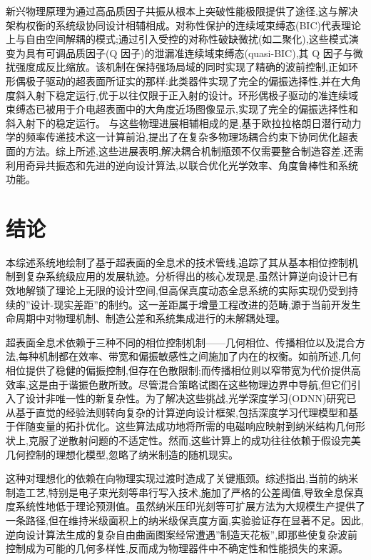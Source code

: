 \documentclass[11pt]{article}
\begin{document}
新兴物理原理为通过高品质因子共振从根本上突破性能极限提供了途径,这与解决架构权衡的系统级协同设计相辅相成。对称性保护的连续域束缚态(BIC)代表理论上与自由空间解耦的模式;通过引入受控的对称性破缺微扰(如二聚化),这些模式演变为具有可调品质因子(Q 因子)的泄漏准连续域束缚态(quasi-BIC),其 Q 因子与微扰强度成反比缩放。该机制在保持强场局域的同时实现了精确的波前控制,正如环形偶极子驱动的超表面所证实的那样:此类器件实现了完全的偏振选择性,并在大角度斜入射下稳定运行,优于以往仅限于正入射的设计。环形偶极子驱动的准连续域束缚态已被用于介电超表面中的大角度近场图像显示,实现了完全的偏振选择性和斜入射下的稳定运行。\citep{s2_5a46bf1115a13c8e88d03d52a56e80871e3550cd_094f009d} 与这些物理进展相辅相成的是,基于欧拉拉格朗日潜行动力学的频率传递技术这一计算前沿,提出了在复杂多物理场耦合约束下协同优化超表面的方法。综上所述,这些进展表明,解决耦合机制瓶颈不仅需要整合制造容差,还需利用奇异共振态和先进的逆向设计算法,以联合优化光学效率、角度鲁棒性和系统功能。\citep{doi_10_1103_physrevapplied_21_044004_d1b93ffe} \citep{s2_5a46bf1115a13c8e88d03d52a56e80871e3550cd_094f009d} \citep{doi_10_1038_s41467_025_57516_z_7c69e056}

\section{结论}\label{ux7ed3ux8bba}

本综述系统地绘制了基于超表面的全息术的技术管线,追踪了其从基本相位控制机制到复杂系统级应用的发展轨迹。分析得出的核心发现是,虽然计算逆向设计已有效地解锁了理论上无限的设计空间,但高保真度动态全息系统的实际实现仍受到持续的''设计-现实差距''的制约。这一差距属于增量工程改进的范畴,源于当前开发生命周期中对物理机制、制造公差和系统集成进行的未解耦处理。

超表面全息术依赖于三种不同的相位控制机制------几何相位、传播相位以及混合方法,每种机制都在效率、带宽和偏振敏感性之间施加了内在的权衡。如前所述,几何相位提供了稳健的偏振控制,但存在色散限制;而传播相位则以窄带宽为代价提供高效率,这是由于谐振色散所致。尽管混合策略试图在这些物理边界中导航,但它们引入了设计非唯一性的新复杂性。为了解决这些挑战,光学深度学习(ODNN)研究已从基于直觉的经验法则转向复杂的计算逆向设计框架,包括深度学习代理模型和基于伴随变量的拓扑优化。这些算法成功地将所需的电磁响应映射到纳米结构几何形状上,克服了逆散射问题的不适定性。然而,这些计算上的成功往往依赖于假设完美几何控制的理想化模型,忽略了纳米制造的随机现实。

这种对理想化的依赖在向物理实现过渡时造成了关键瓶颈。综述指出,当前的纳米制造工艺,特别是电子束光刻等串行写入技术,施加了严格的公差阈值,导致全息保真度系统性地低于理论预测值。虽然纳米压印光刻等可扩展方法为大规模生产提供了一条路径,但在维持米级面积上的纳米级保真度方面,实验验证存在显著不足。因此,逆向设计算法生成的复杂自由曲面图案经常遭遇''制造天花板'',即那些使复杂波前控制成为可能的几何多样性,反而成为物理器件中不确定性和性能损失的来源。
\end{document}

